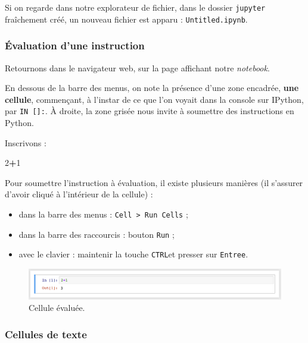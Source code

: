 \documentclass[12pt,]{book}
\newenvironment{Shaded}{\begin{snugshade}}{\end{snugshade}}
\newcommand{\DecValTok}[1]{\textcolor[rgb]{0.00,0.00,0.81}{#1}}
\newcommand{\OperatorTok}[1]{\textcolor[rgb]{0.81,0.36,0.00}{\textbf{#1}}}
\providecommand{\tightlist}{%
  \setlength{\itemsep}{0pt}\setlength{\parskip}{0pt}}
\numberwithin{equation}{section}
\numberwithin{countremarque}{section}
\begin{document}
Si on regarde dans notre explorateur de fichier, dans le dossier
\texttt{jupyter} fraîchement créé, un nouveau fichier est apparu :
\texttt{Untitled.ipynb}.

\subsubsection{Évaluation d'une
instruction}\label{evaluation-dune-instruction}

Retournons dans le navigateur web, sur la page affichant notre
\emph{notebook}.

En dessous de la barre des menus, on note la présence d'une zone
encadrée, \textbf{une cellule}, commençant, à l'instar de ce que l'on
voyait dans la console sur IPython, par \texttt{IN\ {[}{]}:}. À droite,
la zone grisée nous invite à soumettre des instructions en Python.

Inscrivons :

\begin{Shaded}
\begin{Highlighting}[]
\DecValTok{2}\OperatorTok{+}\DecValTok{1}
\end{Highlighting}
\end{Shaded}

Pour soumettre l'instruction à évaluation, il existe plusieurs manières
(il s'assurer d'avoir cliqué à l'intérieur de la cellule) :

\begin{itemize}
\tightlist
\item
  dans la barre des menus : \texttt{Cell\ \textgreater{}\ Run\ Cells} ;
\item
  dans la barre des raccourcis : bouton \texttt{Run} ;
\item
  avec le clavier : maintenir la touche \texttt{CTRL}et presser sur
  \texttt{Entree}.
\end{itemize}

\begin{figure}[H]

{\centering \includegraphics[width=1\linewidth]{figs/jupyter_notebook_2} 

}

\caption{Cellule évaluée.}\label{fig:unnamed-chunk-8}
\end{figure}

\subsubsection{Cellules de texte}\label{cellules-de-texte}
\end{document}
